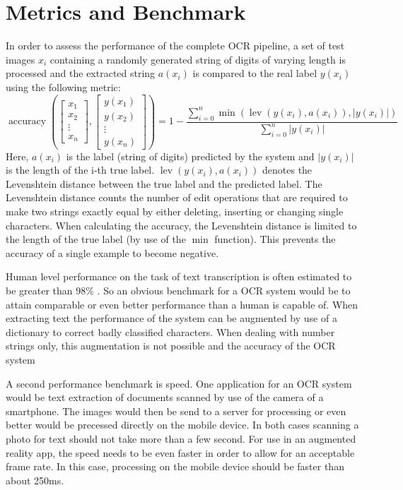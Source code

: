 \documentclass[12pt]{article}
\begin{document}
\section{Metrics and Benchmark}
In order to assess the performance of the complete OCR pipeline, a set of test images $x_i$ containing
a randomly generated string of digits of varying length is processed and the extracted string $a(x_i)$ is
compared to the real label $y(x_i)$ using the following metric:
\begin{equation}
  \operatorname{accuracy}(\begin{bmatrix}x_{1}\\x_{2}\\\vdots\\x_{n}\end{bmatrix},\begin{bmatrix}y(x_{1})\\y(x_{2})\\\vdots\\y(x_{n})\end{bmatrix}) = 1 - \frac{\sum\limits_{i=0}^n{\operatorname{min}\left(\operatorname{lev}(y(x_i), a(x_i)), |y(x_i)|\right)}}{\sum\limits_{i=0}^n{|y(x_i)|}}
\end{equation}
Here, $a(x_i)$ is the label (string of digits) predicted by the system and $|y(x_i)|$ is the length of
the i-th true label. $\operatorname{lev}(y(x_i), a(x_i))$ denotes the Levenshtein distance \cite{Levensht20:online} between
the true label and the predicted label. The Levenshtein distance counts the number of edit operations
that are required to make two strings exactly equal by either deleting, inserting or
changing single characters. When calculating the accuracy, the Levenshtein distance is limited to
the length of the true label (by use of the $\operatorname{min}$ function). This prevents the accuracy
of a single example to become negative.

Human level performance on the task of text transcription is often estimated to be greater
than 98\% \cite{Goodfellow2013}. So an obvious benchmark for a OCR system would be to
attain comparable or even better performance than a human is capable of. When extracting text the
performance of the system can be augmented by use of a dictionary to correct badly classified
characters. When dealing with number strings only, this augmentation is not possible and
the accuracy of the OCR system

A second performance benchmark is speed. One application for an OCR system would be text extraction
of documents scanned by use of the camera of a smartphone. The images would then be send to
a server for processing or even better would be precessed directly on the mobile device.
In both cases scanning a photo for text should not take more than a few second. For use in
an augmented reality app, the speed needs to be even faster in order to allow for an acceptable
frame rate. In this case, processing on the mobile device should be faster than about
250ms.
\end{document}
